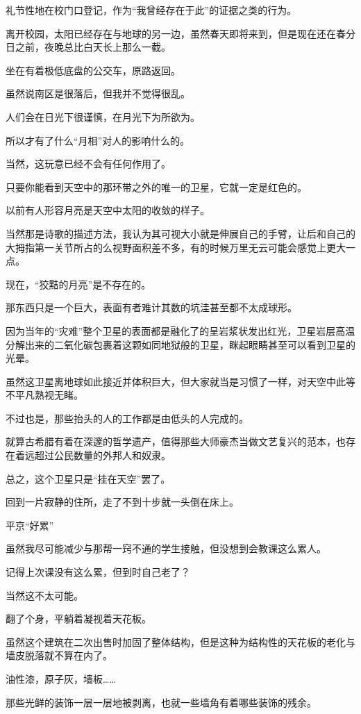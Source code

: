 礼节性地在校门口登记，作为“我曾经存在于此”的证据之类的行为。

离开校园，太阳已经存在与地球的另一边，虽然春天即将来到，但是现在还在春分日之前，夜晚总比白天长上那么一截。

坐在有着极低底盘的公交车，原路返回。

虽然说南区是很落后，但我并不觉得很乱。

人们会在日光下很谨慎，在月光下为所欲为。

所以才有了什么“月相”对人的影响什么的。

当然，这玩意已经不会有任何作用了。

只要你能看到天空中的那环带之外的唯一的卫星，它就一定是红色的。

以前有人形容月亮是天空中太阳的收敛的样子。

当然那是诗歌的描述方法，我认为其可视大小就是伸展自己的手臂，让后和自己的大拇指第一关节所占的么视野面积差不多，有的时候万里无云可能会感觉上更大一点。

现在，“狡黠的月亮”是不存在的。

那东西只是一个巨大，表面有者难计其数的坑洼甚至都不太成球形。

因为当年的“灾难”整个卫星的表面都是融化了的呈岩浆状发出红光，卫星岩层高温分解出来的二氧化碳包裹着这颗如同地狱般的卫星，眯起眼睛甚至可以看到卫星的光晕。

虽然这卫星离地球如此接近并体积巨大，但大家就当是习惯了一样，对天空中此等不平凡熟视无睹。

不过也是，那些抬头的人的工作都是由低头的人完成的。

就算古希腊有着在深邃的哲学遗产，值得那些大师豪杰当做文艺复兴的范本，也存在着远超过公民数量的外邦人和奴隶。

总之，这个卫星只是“挂在天空”罢了。

回到一片寂静的住所，走了不到十步就一头倒在床上。

平京“好累”

虽然我尽可能减少与那帮一窍不通的学生接触，但没想到会教课这么累人。

记得上次课没有这么累，但到时自己老了？

当然这不太可能。

翻了个身，平躺着凝视着天花板。

虽然这个建筑在二次出售时加固了整体结构，但是这种为结构性的天花板的老化与墙皮脱落就不算在内了。

油性漆，原子灰，墙板……

那些光鲜的装饰一层一层地被剥离，也就一些墙角有着哪些装饰的残余。

